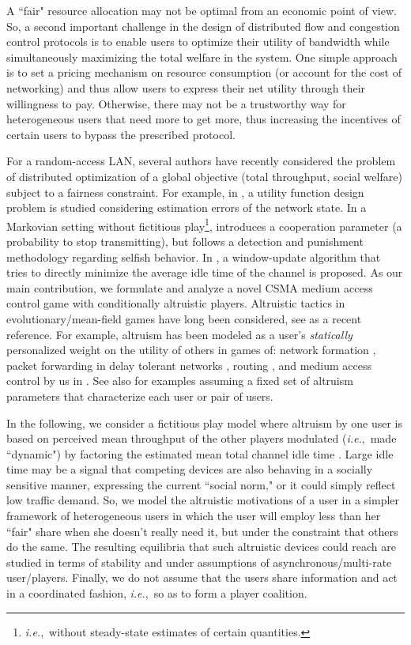 \documentclass[12pt,onecolumn,draftcls]{IEEEtran}
\newcommand{\ie}{{\em i.e.},~}
\begin{document}
A ``fair" resource allocation may not be optimal from an economic point
of view. So, a second important challenge in the design of distributed
flow and
congestion control protocols is to enable users to optimize their utility
of bandwidth while simultaneously maximizing the total welfare in the
system. One simple approach is to set a pricing mechanism on resource 
consumption (or
account for the cost of networking) and thus allow users to express their
net utility through their willingness to pay.
Otherwise, there may not be a 
trustworthy way for heterogeneous users that need more to get more, thus
increasing the incentives of certain users to bypass the prescribed
protocol.

For a random-access LAN, several authors have recently considered the
problem of distributed optimization of a global objective (total
throughput, social welfare) subject to a fairness constraint.  For example,
in \cite{Cui08}, a utility function design problem is studied  considering
estimation errors of the network state.  In a  Markovian setting without
fictitious play\footnote{\ie without steady-state estimates of certain
quantities.}, \cite{Ma09} introduces a cooperation parameter (a probability
to stop transmitting), but follows a detection and punishment methodology
regarding selfish behavior.  In \cite{Heusse05}, a window-update algorithm
that tries to directly  minimize the average idle time of the channel  
is proposed.
As our main contribution, we formulate and analyze a novel CSMA medium access
control game with conditionally altruistic players.  Altruistic tactics in
evolutionary/mean-field games have long been considered, see
\cite{Malhame_CDC_2010} as a recent reference.  For example, altruism has
been modeled 
as a user's {\em statically} personalized weight on the utility of others
in games of: network formation \cite{martignon}, packet
forwarding in delay tolerant networks \cite{hui}, routing \cite{Azad09},
and medium access control by us in \cite{Kesidis10-cdc}.
See also
\cite{Hoefer09,Caragiannis10,Chen11}  for examples 
assuming a fixed set of 
altruism parameters that characterize each user or pair of users.


In the following, we consider a fictitious play model where altruism by one
user is based on perceived mean throughput of the other players
modulated (\ie made ``dynamic") by factoring the estimated mean
total channel idle time \cite{Heusse05}.
Large idle time may be a signal that competing
devices are also behaving in a socially sensitive manner, expressing
the current ``social norm," or it could simply reflect low traffic
demand.
So, we model the altruistic motivations of a user in a simpler
framework of heterogeneous users in which the user will employ
less than her ``fair" share when she doesn't really need it,
but under the constraint that others do the same.
The resulting equilibria that such
altruistic devices could reach are studied in terms of stability and under
assumptions of asynchronous/multi-rate user/players. Finally, we do not assume
that the users share information and act in a coordinated fashion, \ie so
as to form a player coalition.
\end{document}
